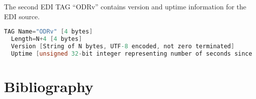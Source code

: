 The second EDI TAG ``ODRv'' contains version and uptime information for the EDI source.
\begin{lstlisting}[language=C]
  TAG Name="ODRv" [4 bytes]
  Length=N+4 [4 bytes]
  Version [String of N bytes, UTF-8 encoded, not zero terminated]
  Uptime [unsigned 32-bit integer representing number of seconds since program start]
\end{lstlisting}


\section{Bibliography}



